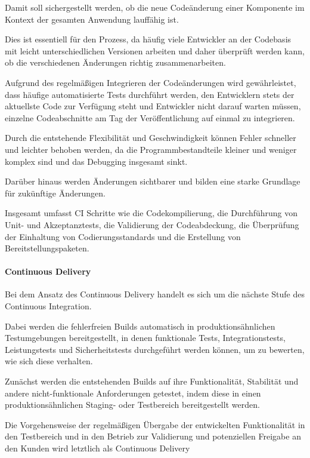 Damit soll sichergestellt werden, ob die neue Codeänderung einer Komponente im Kontext der gesamten Anwendung lauffähig ist. 

Dies ist essentiell für den Prozess, da häufig viele Entwickler an der Codebasis mit leicht unterschiedlichen Versionen arbeiten und daher überprüft werden kann, ob die verschiedenen Änderungen richtig zusammenarbeiten. \cite[S. 69]{verona_practical_2016} 

Aufgrund des regelmäßigen Integrieren der Codeänderungen wird gewährleistet, dass häufige automatisierte Tests durchführt werden, den Entwicklern stets der aktuellste Code zur Verfügung steht und Entwickler nicht darauf warten müssen, einzelne Codeabschnitte am Tag der Veröffentlichung auf einmal zu integrieren. \cite{thedev_eight_2019} 

Durch die entstehende Flexibilität und Geschwindigkeit können Fehler schneller und leichter behoben werden, da die Programmbestandteile kleiner und weniger komplex sind und das Debugging insgesamt sinkt. \cite{thedev_eight_2019}

Darüber hinaus werden Änderungen sichtbarer und bilden eine starke Grundlage für zukünftige Änderungen. 

Insgesamt umfasst CI Schritte wie die Codekompilierung, die Durchführung von Unit- und Akzeptanztests, die Validierung der Codeabdeckung, die Überprüfung der Einhaltung von Codierungsstandards und die Erstellung von Bereitstellungspaketen. \cite{fitzgerald_continuous_2014} 

\paragraph{Continuous Delivery}

Bei dem Ansatz des Continuous Delivery handelt es sich um die nächste Stufe des Continuous Integration. 

Dabei werden die fehlerfreien Builds automatisch in produktionsähnlichen Testumgebungen bereitgestellt, in denen funktionale Tests, Integrationstests, Leistungstests und Sicherheitstests durchgeführt werden können, um zu bewerten, wie sich diese verhalten.

Zunächst werden die entstehenden Builds auf ihre Funktionalität, Stabilität und andere nicht-funktionale Anforderungen getestet, indem diese in einen produktionsähnlichen Staging- oder Testbereich bereitgestellt werden.

Die Vorgehensweise der regelmäßigen Übergabe der entwickelten Funktionalität in den Testbereich und in den Betrieb zur Validierung und potenziellen Freigabe an den Kunden wird letztlich als Continuous Delivery

